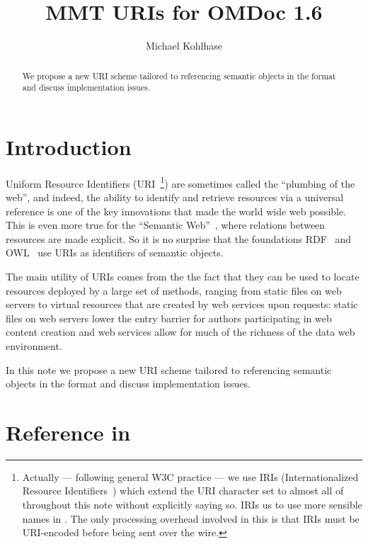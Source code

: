 \documentclass[12pt]{article}
\title{MMT URIs for OMDoc 1.6}
\author{Michael Kohlhase}
\begin{document}
\maketitle
\begin{abstract}
  We propose a new URI scheme tailored to referencing semantic objects in the {}
  format and discuss implementation issues.
\end{abstract}

\section{Introduction}

Uniform Resource Identifiers (URI~\cite{BerFie:uri98}\footnote{Actually --- following
  general W3C practice --- we use IRIs (Internationalized Resource
  Identifiers~\cite{DueSui:iri05}) which extend the URI character set to almost all of
  {\unicode} throughout this note without explicitly saying so. IRIs us to use more
  sensible names in {\omdoc}. The only processing overhead involved in this is that IRIs
  must be URI-encoded before being sent over the wire.}) are sometimes called the
``plumbing of the web'', and indeed, the ability to identify and retrieve resources via a
universal reference is one of the key innovations that made the world wide web
possible. This is even more true for the ``Semantic Web''~\cite{Berners-Lee:SemanticWeb},
where relations between resources are made explicit. So it is no surprise that the
foundations RDF~\cite{manola04:rdfprimer} and OWL~\cite{McGvHa:owl04} use URIs as
identifiers of semantic objects.

The main utility of URIs comes from the the fact that they can be used to locate resources
deployed by a large set of methods, ranging from static files on web servers to virtual
resources that are created by web services upon requests: static files on web servers
lower the entry barrier for authors participating in web content creation and web services
allow for much of the richness of the data web environment.

In this note we propose a new URI scheme tailored to referencing semantic objects in the
{} format and discuss implementation issues.

\section{Reference in {}}
\end{document}

